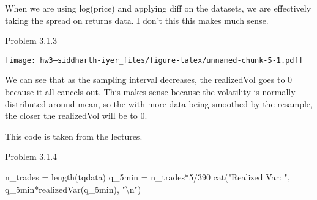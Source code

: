 \documentclass[
]{article}
\newenvironment{Shaded}{\begin{snugshade}}{\end{snugshade}}
\newcommand{\AttributeTok}[1]{\textcolor[rgb]{0.77,0.63,0.00}{#1}}
\newcommand{\CommentTok}[1]{\textcolor[rgb]{0.56,0.35,0.01}{\textit{#1}}}
\newcommand{\ConstantTok}[1]{\textcolor[rgb]{0.00,0.00,0.00}{#1}}
\newcommand{\ControlFlowTok}[1]{\textcolor[rgb]{0.13,0.29,0.53}{\textbf{#1}}}
\newcommand{\DecValTok}[1]{\textcolor[rgb]{0.00,0.00,0.81}{#1}}
\newcommand{\FunctionTok}[1]{\textcolor[rgb]{0.00,0.00,0.00}{#1}}
\newcommand{\NormalTok}[1]{#1}
\newcommand{\OtherTok}[1]{\textcolor[rgb]{0.56,0.35,0.01}{#1}}
\newcommand{\SpecialCharTok}[1]{\textcolor[rgb]{0.00,0.00,0.00}{#1}}
\newcommand{\StringTok}[1]{\textcolor[rgb]{0.31,0.60,0.02}{#1}}
\begin{document}
When we are using log(price) and applying diff on the datasets, we are
effectively taking the spread on returns data. I don't this this makes
much sense.

Problem 3.1.3

\begin{Shaded}
\end{Shaded}

\texttt{[image: hw3---siddharth-iyer\_files/figure-latex/unnamed-chunk-5-1.pdf]}

We can see that as the sampling interval decreases, the realizedVol goes
to 0 because it all cancels out. This makes sense because the volatility
is normally distributed around mean, so the with more data being
smoothed by the resample, the closer the realizedVol will be to 0.

This code is taken from the lectures.

Problem 3.1.4

\begin{Shaded}
\begin{Highlighting}[]
\NormalTok{n\_trades }\OtherTok{=} \FunctionTok{length}\NormalTok{(tqdata)}
\NormalTok{q\_5min }\OtherTok{=}\NormalTok{ n\_trades}\SpecialCharTok{*}\DecValTok{5}\SpecialCharTok{/}\DecValTok{390}
\FunctionTok{cat}\NormalTok{(}\StringTok{"Realized Var: "}\NormalTok{, q\_5min}\SpecialCharTok{*}\FunctionTok{realizedVar}\NormalTok{(q\_5min), }\StringTok{"}\SpecialCharTok{\textbackslash{}n}\StringTok{"}\NormalTok{)}
\end{Highlighting}
\end{Shaded}
\end{document}

